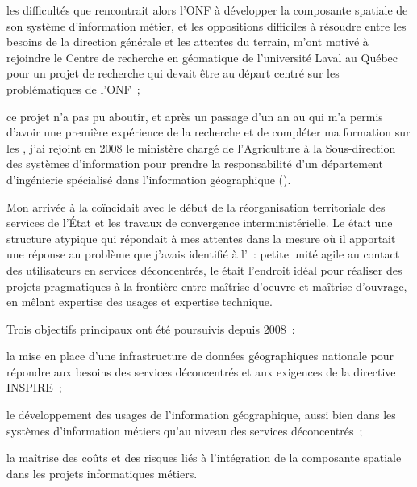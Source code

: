 \item les difficultés que rencontrait alors l'ONF
      à développer la composante spatiale de son
      système d'information métier, et les oppositions
      difficiles à résoudre entre les besoins de la direction générale
      et les attentes du terrain, m'ont motivé à rejoindre
      le Centre de recherche en géomatique de l'université Laval au Québec
      pour un projet de recherche qui devait être au départ
      centré sur les problématiques de l'ONF~;

\item ce projet n'a pas pu aboutir,
      et après un passage d'un an au {\CRG} qui m'a permis
      d'avoir une première expérience de la recherche et de
      compléter ma formation sur les {\SIG}, j'ai rejoint en 2008 le ministère
      chargé de l'Agriculture à la Sous-direction des systèmes 
      d'information pour prendre la responsabilité
      d'un département d'ingénierie spécialisé dans
      l'information géographique ({\DIG}).

\stopitemize

Mon arrivée à la {\SDSI}
coïncidait avec le début de la réorganisation territoriale
des services de l'État et les travaux de convergence
interministérielle.
Le {\DIG} était une structure atypique qui répondait à mes attentes
dans la mesure où il apportait une réponse au problème que j'avais identifié à l'{\ONF}~:
petite unité agile au contact des utilisateurs en services déconcentrés,
le {\DIG} était l'endroit idéal pour réaliser des projets pragmatiques à la frontière
entre maîtrise d'oeuvre et maîtrise d'ouvrage,
en mêlant expertise des usages et expertise technique.

Trois objectifs principaux ont été poursuivis depuis 2008~:

\startitemize

\item la mise en place d'une infrastructure
      de données géographiques nationale pour répondre aux besoins
      des services déconcentrés et aux exigences
      de la directive INSPIRE~;

\item le développement des usages de l'information géographique,
      aussi bien dans les systèmes d'information métiers
      qu'au niveau des services déconcentrés~;

\item la maîtrise des coûts et des risques
      liés à l'intégration de la composante spatiale
      dans les projets informatiques métiers.

